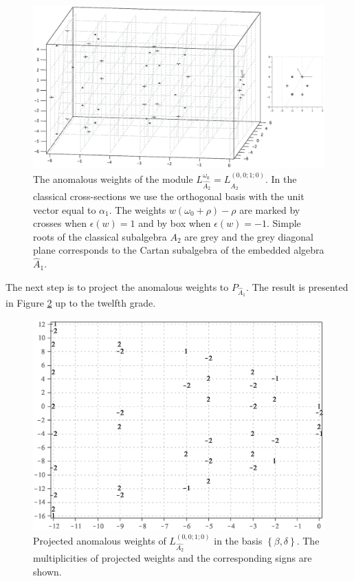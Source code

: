 \documentclass[12pt]{iopart}
\theoremstyle{definition}
\begin{document}
\begin{figure}[h!tb]
  \hspace*{-1.5cm}
  \includegraphics[width=180mm]{figure7.eps}
  \caption{The anomalous weights of the module $L_{\hat{A_2}}^{\omega_0}=L^{(0,0;1;0)}_{\hat{A_2}}$. In the classical cross-sections we use the orthogonal basis with the unit vector equal to $\alpha_1$.
  The weights $w (\omega_0+\rho)-\rho$ are marked by crosses when $\epsilon(w)=1$ and
by box when $\epsilon(w)=-1$. Simple roots of the classical subalgebra $A_2$ are
grey and the grey diagonal plane corresponds to the Cartan subalgebra of
the embedded algebra $\hat{A}_1$.}
  \label{fig:affine_A2_anom_point}
\end{figure}

The next step is to project the anomalous weights to $P_{\hat A_1}$.
The result is presented in Figure \ref{fig:AffineA2_A1_anom_proj} up to the twelfth grade.
\begin{figure}[h!tb]
  \centering
  \includegraphics[width=130mm]{figure8.eps}
  \caption{Projected anomalous weights of $L^{(0,0;1;0)}_{\hat{A_2}}$ in the basis $\left\{\beta,\delta \right\}$.
  The multiplicities of projected weights and the corresponding signs are shown. }
  \label{fig:AffineA2_A1_anom_proj}
\end{figure}
\end{document}
